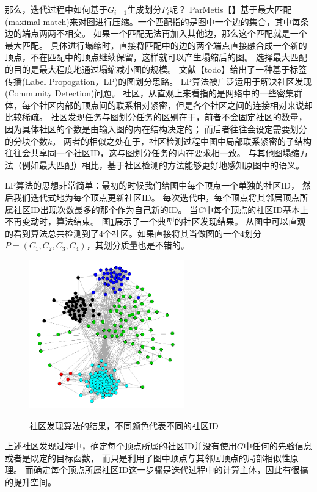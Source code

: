 \documentclass[master]{njuthesis}
\begin{document}
那么，迭代过程中如何基于$G_{i-1}$生成划分$P_i$呢？
ParMetis【】基于最大匹配(maximal match)来对图进行压缩。一个匹配指的是图中一个边的集合，其中每条边的端点两两不相交。
如果一个匹配无法再加入其他边，那么这个匹配就是一个最大匹配。
具体进行塌缩时，直接将匹配中的边的两个端点直接融合成一个新的顶点，不在匹配中的顶点继续保留，这样就可以产生塌缩后的图。
选择最大匹配的目的是最大程度地通过塌缩减小图的规模。
文献【todo】给出了一种基于标签传播(Label Propogation，LP)的图划分思路。
LP算法被广泛运用于解决社区发现(Community Detection)问题。
社区，从直观上来看指的是网络中的一些密集群体，每个社区内部的顶点间的联系相对紧密，但是各个社区之间的连接相对来说却比较稀疏。
社区发现任务与图划分任务的区别在于，前者不会固定社区的数量，因为具体社区的个数是由输入图的内在结构决定的；
而后者往往会设定需要划分的分块个数$k$。
两者的相似之处在于，社区检测过程中图中局部联系紧密的子结构往往会共享同一个社区ID，这与图划分任务的内在要求相一致。
与其他图塌缩方法（例如最大匹配）相比，基于社区检测的方法能够更好地感知原图中的语义。

LP算法的思想非常简单：最初的时候我们给图中每个顶点一个单独的社区ID，
然后我们迭代式地为每个顶点更新社区ID。
每次迭代中，每个顶点将其邻居顶点所属社区ID出现次数最多的那个作为自己新的ID。
当$G$中每个顶点的社区ID基本上不再变动时，算法结束。
图\ref{fig:mlp_cd}展示了一个典型的社区发现结果。
从图中可以直观的看到算法总共检测到了4个社区。如果直接将其当做图的一个4划分$P=(C_1, C_2, C_3, C_4)$，其划分质量也是不错的。
\begin{figure}[htbp]
  \centering
  \includegraphics[width= 0.6\textwidth]{figure/lp.png}\\
  \caption{社区发现算法的结果，不同颜色代表不同的社区ID}
   \label{fig:mlp_cd}
\end{figure}

上述社区发现过程中，确定每个顶点所属的社区ID并没有使用$G$中任何的先验信息或者是既定的目标函数，
而只是利用了图中顶点与其邻居顶点的局部相似性原理。
而确定每个顶点所属社区ID这一步骤是迭代过程中的计算主体，因此有很搞的提升空间。
\end{document}
